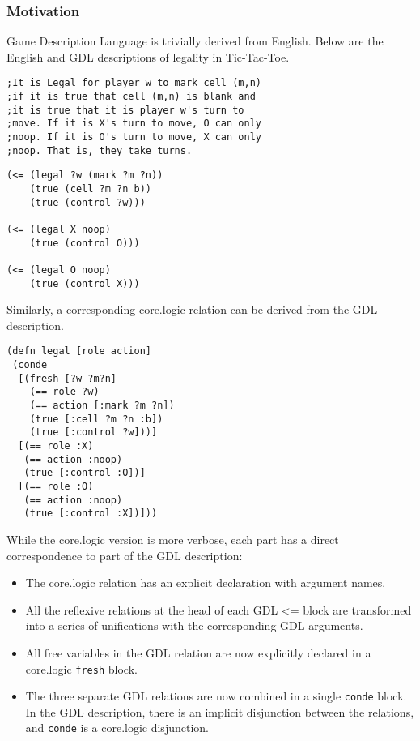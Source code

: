 \documentclass[letterpaper]{article}
\begin{document}
\subsubsection{Motivation}
Game Description Language is trivially derived from English. Below are the English and GDL descriptions of legality in Tic-Tac-Toe.
\begin{lstlisting}[frame=single, caption=The Legal relation for Tic-Tac-Toe expressed in English]
;It is Legal for player w to mark cell (m,n)
;if it is true that cell (m,n) is blank and
;it is true that it is player w's turn to
;move. If it is X's turn to move, O can only
;noop. If it is O's turn to move, X can only
;noop. That is, they take turns. 
\end{lstlisting}
\begin{lstlisting}[frame=single, caption=The Legal relation for Tic-Tac-Toe expressed in GDL]
(<= (legal ?w (mark ?m ?n))
    (true (cell ?m ?n b))
    (true (control ?w)))

(<= (legal X noop)
    (true (control O)))

(<= (legal O noop)
    (true (control X)))
\end{lstlisting}

Similarly, a corresponding core.logic relation can be derived from the GDL description.

\begin{lstlisting}[frame=single, caption=The Legal relation translated into core.logic]
(defn legal [role action]
 (conde
  [(fresh [?w ?m?n]
    (== role ?w)
    (== action [:mark ?m ?n])
    (true [:cell ?m ?n :b])
    (true [:control ?w]))]
  [(== role :X)
   (== action :noop)
   (true [:control :O])]
  [(== role :O)
   (== action :noop)
   (true [:control :X])]))
\end{lstlisting}

While the core.logic version is more verbose, each part has a direct correspondence to part of the GDL description:
\begin{itemize}
\item The core.logic relation has an explicit declaration with argument names.
\item All the reflexive relations at the head of each GDL \textless= block are transformed into a series of unifications with the corresponding GDL arguments. 
\item All free variables in the GDL relation are now explicitly declared in a core.logic \texttt{fresh} block.
\item The three separate GDL relations are now combined in a single \texttt{conde} block. In the GDL description, there is an implicit disjunction between the relations, and \texttt{conde} is a core.logic disjunction.
\end{itemize}
\end{document}
